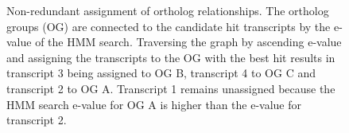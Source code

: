 \begin{figure}[h]
	\centering
	\def\svgwidth{0.8\textwidth}
	
	\caption[Non-redundant assignment of ortholog relationships]{
		Non-redundant assignment of ortholog relationships. The ortholog groups (OG)
		are connected to the candidate hit transcripts by the e-value of the HMM
		search. Traversing the graph by ascending e-value and assigning the
		transcripts to the OG with the best hit results in transcript 3 being
		assigned to OG B, transcript 4 to OG C and transcript 2 to OG A. Transcript
		1 remains unassigned because the HMM search e-value for OG A is higher than
		the e-value for transcript 2.
	}
	\label{fig:orthograph-graph}
\end{figure}

